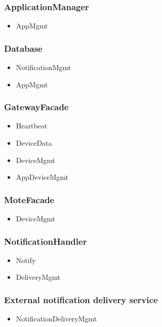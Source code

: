     \subsubsection{ApplicationManager}
        \begin{itemize}
            \item AppMgmt
        \end{itemize}

    \subsubsection{Database}
        \begin{itemize}
            \item NotificationMgmt
            \item AppMgmt
        \end{itemize}

    \subsubsection{GatewayFacade}
        \begin{itemize}
            \item Heartbeat
            \item DeviceData
            \item DeviceMgmt
            \item AppDeviceMgmt
        \end{itemize}

    \subsubsection{MoteFacade}
        \begin{itemize}
            \item DeviceMgmt
        \end{itemize}

    \subsubsection{NotificationHandler}
        \begin{itemize}
            \item Notify
            \item DeliveryMgmt
        \end{itemize}

    \subsubsection{External notification delivery service}
        \begin{itemize}
            \item NotificationDeliveryMgmt
        \end{itemize}


